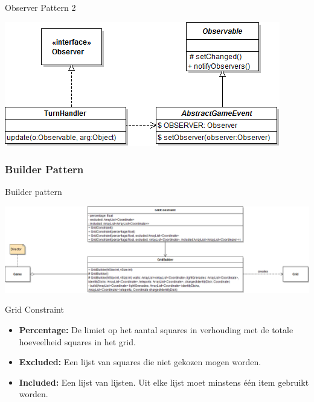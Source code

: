 \documentclass[t]{beamer}
\begin{document}
\begin{frame}{Observer Pattern 2}
\begin{center}
\includegraphics[width=1\linewidth]{images/observer2}
\end{center}
\end{frame}

\subsubsection{Builder Pattern}
\begin{frame}{Builder pattern}
\begin{center}
\vspace{0.3in}
\includegraphics[width=1\linewidth]{images/GridBuilder}
\end{center}
\end{frame}
\begin{frame}{Grid Constraint}
\vspace{0.4in}
\begin{itemize}
	\item \textbf{Percentage:} De limiet op het aantal squares in verhouding met de totale hoeveelheid squares in het grid.
	\item \textbf{Excluded:} Een lijst van squares die niet gekozen mogen worden.
	\item \textbf{Included:} Een lijst van lijsten. Uit elke lijst moet minstens \'e\'en item gebruikt worden.
\end{itemize}
\end{frame}
\end{document}
